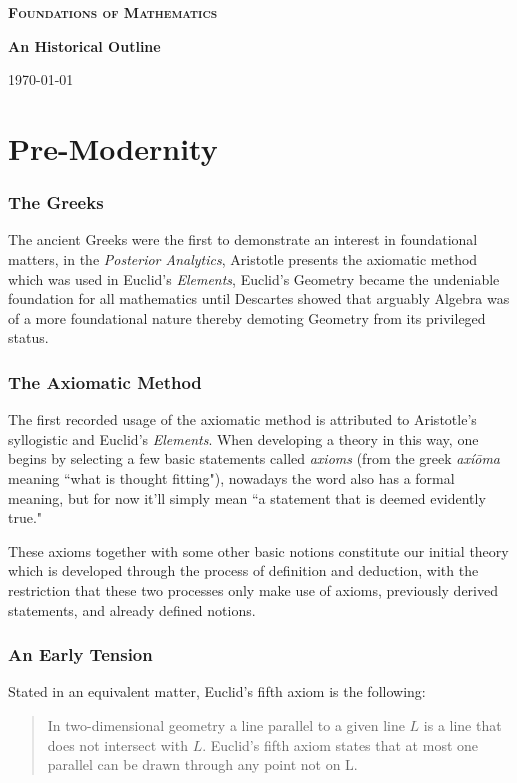 \documentclass[12p]{article}
\theoremstyle{definition}
\begin{document}
\begin{titlepage}
	\centering

	{\scshape\huge \bf Foundations of Mathematics \par}
	\vspace{0.5cm}
	{\huge\bfseries An Historical Outline \par}
	\vspace{2cm}

	
	\vfill
	
	{\large \today\par}
\end{titlepage}
\newpage
\tableofcontents
\newpage
\setcounter{page}{1}
\section{Pre-Modernity}

\subsubsection{The Greeks}The ancient Greeks were the first to demonstrate an interest in foundational matters, in the \textit{Posterior Analytics}, Aristotle presents the axiomatic method which was used in Euclid's \textit{Elements},  Euclid's Geometry became the undeniable foundation for all mathematics until Descartes showed that arguably Algebra was of a more foundational nature thereby demoting Geometry from its privileged status.

\subsubsection{The Axiomatic Method}
The first recorded usage of the axiomatic method is attributed to Aristotle's syllogistic and Euclid's \textit{Elements}. When developing a theory in this way, one begins by selecting a few basic statements called \textit{axioms} (from the greek \textit{axíōma} meaning ``what is thought fitting"), nowadays the word also has a formal meaning, but for now it'll simply mean ``a statement that is deemed evidently true."

These axioms together with some other basic notions constitute our initial theory which is developed through the process of definition and deduction, with the restriction that these two processes only make use of axioms, previously derived statements, and already defined notions.

\subsubsection{An Early Tension}
Stated in an equivalent matter, Euclid's fifth axiom is the following:
\begin{quote}
In two-dimensional geometry a line parallel to a given line $L$ is a line that does not intersect with $L$. Euclid’s fifth axiom states that at most one parallel can be drawn through any point not on L. \cite{robivc2015foundations}
\end{quote}
\end{document}
